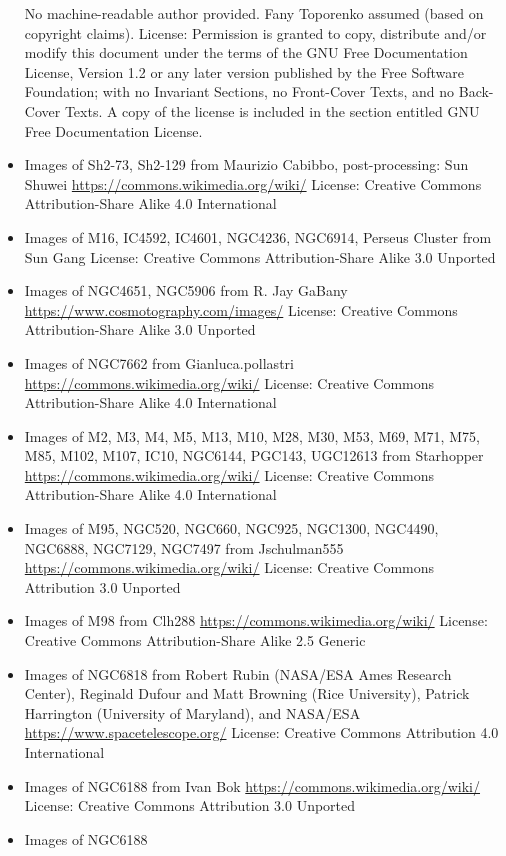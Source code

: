 \begin{itemize}
	 No machine-readable author provided. Fany Toporenko assumed (based on copyright claims).
	 License: Permission is granted to copy, distribute and/or modify this document
	 under the terms of the GNU Free Documentation License, Version 1.2 or any later
	 version published by the Free Software Foundation; with no Invariant Sections,
	 no Front-Cover Texts, and no Back-Cover Texts. A copy of the license is
	 included in the section entitled GNU Free Documentation License.
\item Images of Sh2-73, Sh2-129
	 from Maurizio Cabibbo, post-processing: Sun Shuwei
	 \url{https://commons.wikimedia.org/wiki/}
	 License: Creative Commons Attribution-Share Alike 4.0 International
\item Images of M16, IC4592, IC4601, NGC4236, NGC6914, Perseus Cluster
	 from Sun Gang
	 License: Creative Commons Attribution-Share Alike 3.0 Unported
\item Images of NGC4651, NGC5906
	 from R. Jay GaBany
	 \url{https://www.cosmotography.com/images/}
	 License: Creative Commons Attribution-Share Alike 3.0 Unported
\item Images of NGC7662
	 from Gianluca.pollastri
	 \url{https://commons.wikimedia.org/wiki/}
	 License: Creative Commons Attribution-Share Alike 4.0 International
\item Images of M2, M3, M4, M5, M13, M10, M28, M30, M53, M69, M71, M75, M85, M102,
	 M107, IC10, NGC6144, PGC143, UGC12613
	 from Starhopper
	 \url{https://commons.wikimedia.org/wiki/}
	 License: Creative Commons Attribution-Share Alike 4.0 International
\item Images of M95, NGC520, NGC660, NGC925, NGC1300, NGC4490, NGC6888, NGC7129, NGC7497
	 from Jschulman555
	 \url{https://commons.wikimedia.org/wiki/}
	 License: Creative Commons Attribution 3.0 Unported
\item Images of M98
	 from Clh288
	 \url{https://commons.wikimedia.org/wiki/}
	 License: Creative Commons Attribution-Share Alike 2.5 Generic
\item Images of NGC6818
	 from Robert Rubin (NASA/ESA Ames Research Center), Reginald Dufour and Matt Browning (Rice University), Patrick Harrington (University of Maryland), and NASA/ESA
	 \url{https://www.spacetelescope.org/}
	 License: Creative Commons Attribution 4.0 International
\item Images of NGC6188
	 from Ivan Bok
	 \url{https://commons.wikimedia.org/wiki/}
	 License: Creative Commons Attribution 3.0 Unported
\item Images of NGC6188

\end{itemize}
